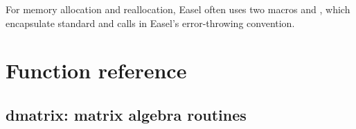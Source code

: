 \documentclass[11pt]{article}
\begin{document}
For memory allocation and reallocation, Easel often uses two macros
 and , which encapsulate
standard  and  calls in Easel's
error-throwing convention.



\section{Function reference}

\subsection{dmatrix: matrix algebra routines}

\end{document}
